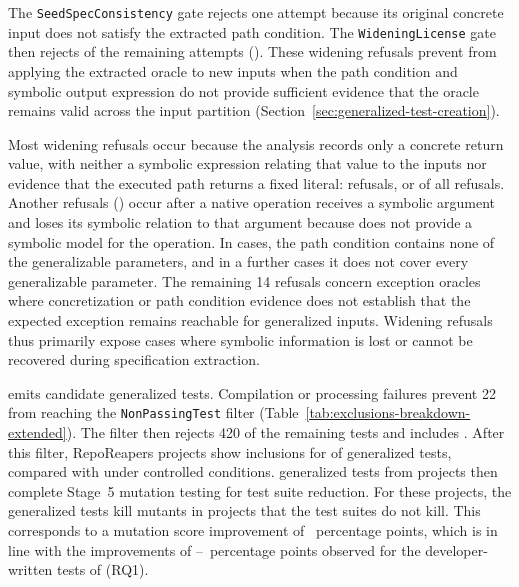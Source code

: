 The \texttt{SeedSpecConsistency} gate rejects one attempt because its original concrete input does
not satisfy the extracted path condition. The \texttt{WideningLicense} gate then rejects
\TzRealworldWideningRefusals{} of the remaining attempts
(\TzRealworldWideningRefusalsPct{}). These widening refusals prevent \ToolTeralizer{} from applying
the extracted oracle to new inputs when the path condition and symbolic output expression
do not provide sufficient evidence that the oracle remains valid across the input partition
(Section~\ref{sec:generalized-test-creation}).

Most widening refusals occur because the analysis records only a concrete return value,
with neither a symbolic expression relating that value to the inputs
nor evidence that the executed path returns a fixed literal:
\TzRealworldWideningRefusalOutputNotLiteral{} refusals, or
\TzRealworldWideningRefusalOutputNotLiteralPct{} of all refusals. Another
\TzRealworldWideningRefusalConcretization{} refusals
(\TzRealworldWideningRefusalConcretizationPct{}) occur
after a native operation receives a symbolic argument
and loses its symbolic relation to that argument
because \ToolSPF{} does not provide a symbolic model for the operation.
In \TzRealworldWideningRefusalParametersEmpty{} cases,
the path condition contains none of the generalizable parameters,
and in a further \TzRealworldWideningRefusalPathCoverage{} cases
it does not cover every generalizable parameter.
The remaining 14 refusals concern exception oracles
where concretization or path condition evidence
does not establish that the expected exception remains reachable
for generalized inputs.
Widening refusals thus primarily expose cases
where symbolic information is lost
or cannot be recovered during specification extraction.

\ToolTeralizer{} emits \TzRealworldGeneralizationsEmitted{} candidate generalized tests.
Compilation or processing failures prevent 22
from reaching the \texttt{NonPassingTest} filter
(Table~\ref{tab:exclusions-breakdown-extended}).
The filter then rejects 420 of the remaining
\TzRealworldGeneralizationsFilterResultRecorded{} tests
and includes \TzRealworldGeneralizationsFilterPassed{}.
After this filter, RepoReapers projects
show inclusions for \TzRqsixFilteringRealworldIncludedPct{} of generalized tests,
compared with \TzRqsixFilteringControlledIncludedPct{} under controlled conditions.
\TzRealworldGeneralizationsFinalUsable{} generalized tests from
\TzRealworldFinalUsableProjects{} projects then complete Stage~5
mutation testing for test suite reduction.
For these projects, the generalized tests kill
\TzRealworldMutationGeneralizedOnlyKills{} mutants
in \TzRealworldMutationGeneralizedOnlyKillProjects{} projects
that the \VariantInitial{} test suites do not kill.
This corresponds to a mutation score improvement of
\TzRealworldMutationGeneralizedOnlyKillsPp{}~percentage points,
which is in line with the improvements of
\TzEffectivenessCommonsDeveloperMutationImprovementMinPp{}--\TzEffectivenessCommonsDeveloperMutationImprovementMaxPp{}~percentage points observed
for the developer-written tests of \DatasetCommonsDev{} (RQ1).

